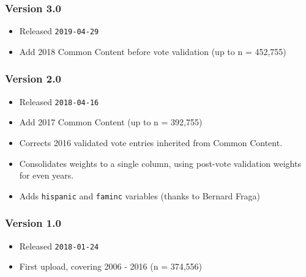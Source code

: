 \documentclass[10pt,article,oneside]{memoir}
\theoremstyle{definition}
\begin{document}
\hypertarget{version-3.0}{%
\subsubsection{Version 3.0}\label{version-3.0}}

\begin{itemize}
\tightlist
\item
  Released \texttt{2019-04-29}
\item
  Add 2018 Common Content before vote validation (up to n = 452,755)
\end{itemize}

\hypertarget{version-2.0}{%
\subsubsection{Version 2.0}\label{version-2.0}}

\begin{itemize}
\tightlist
\item
  Released \texttt{2018-04-16}
\item
  Add 2017 Common Content (up to n = 392,755)
\item
  Corrects 2016 validated vote entries inherited from Common Content.
\item
  Consolidates weights to a single column, using post-vote validation
  weights for even years.
\item
  Adds \texttt{hispanic} and \texttt{faminc} variables (thanks to
  Bernard Fraga)
\end{itemize}

\hypertarget{version-1.0}{%
\subsubsection{Version 1.0}\label{version-1.0}}

\begin{itemize}
\tightlist
\item
  Released \texttt{2018-01-24}
\item
  First upload, covering 2006 - 2016 (n = 374,556)
\end{itemize}
\end{document}
